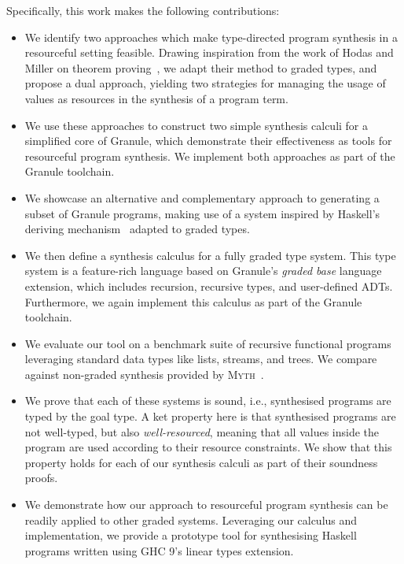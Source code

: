 Specifically, this work makes the following contributions:
\begin{itemize}
  \item We identify two approaches which make type-directed program synthesis in
        a resourceful setting feasible. Drawing inspiration from the work of
        Hodas and Miller on theorem proving~\citep{HODAS1994327}, we adapt their
        method to graded types, and propose a dual approach, yielding two
        strategies for managing the usage of values as resources in the
        synthesis of a program term. 

  \item We use these approaches to construct two simple synthesis calculi for a
        simplified core of Granule, which demonstrate their effectiveness as
        tools for resourceful program synthesis. We implement both approaches as 
        part of the Granule toolchain. 

  \item We showcase an alternative and complementary approach to generating a
        subset of Granule programs, making use of a system inspired by Haskell's
        deriving mechanism~\cite{generic-deriving} adapted to graded types.

  \item We then define a synthesis calculus for a fully graded type system. This
        type system is a feature-rich language based on Granule's \emph{graded
        base} language extension, which includes recursion, recursive types, and
        user-defined ADTs. Furthermore, we again implement this calculus as part
        of the Granule toolchain.

  \item We evaluate our tool on a benchmark suite of recursive functional
        programs leveraging standard data types like lists, streams, and trees.
        We compare against non-graded synthesis provided by
        \textsc{Myth}~\citep{oseraMYTH1}.

  \item We prove that each of these systems is sound, i.e., synthesised programs
        are typed by the goal type. A ket property here is that synthesised programs 
        are not well-typed, but also \emph{well-resourced}, meaning that all values  
        inside the program are used according to their resource constraints. We
        show that this property holds for each of our synthesis calculi as part
        of their soundness proofs. 

  \item We demonstrate how our approach to resourceful program synthesis can be
        readily applied to other graded systems. Leveraging our calculus and
        implementation, we provide a prototype tool for synthesising Haskell
        programs written using GHC 9's linear types extension.
\end{itemize}
